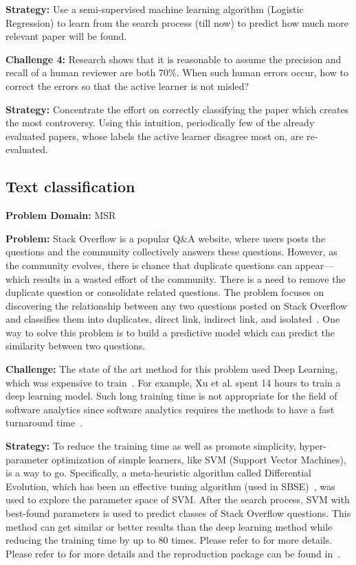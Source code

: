 \documentclass[sigconf,anonymous,review]{acmart}
\begin{document}
\noindent\textbf{Strategy: }
Use a semi-supervised machine learning algorithm (Logistic Regression) to learn from the search process (till now) to predict how much more relevant paper will be found. 

\vspace{1.0ex}
\noindent\textbf{Challenge 4: }
Research shows that it is reasonable to assume the precision and recall of a human reviewer are both 70\%. When such human errors occur, how to correct the errors so that the active learner is not misled?

\noindent\textbf{Strategy: }
Concentrate the effort on correctly classifying the paper which creates the most controversy. Using this intuition, periodically few of the already evaluated papers, whose labels the active learner disagree most on, are re-evaluated.

    \subsection{Text classification}
\noindent\textbf{Problem Domain: } MSR

\noindent\textbf{Problem: } Stack Overflow is a popular Q\&A website, where users posts the questions and the community collectively answers these questions. However, as the community evolves, there is chance that duplicate questions can appear---which results in a wasted effort of the community. There is a need to remove the duplicate question or consolidate related questions. The problem focuses on discovering the relationship between any two questions posted on Stack Overflow and classifies them into duplicates, direct link, indirect link, and isolated~\cite{fu2017easy, xu2016predicting}. One way to solve this problem is to build a predictive model which can predict the similarity between two questions. 

\noindent\textbf{Challenge: } The state of the art method for this problem used Deep Learning, which was expensive to train~\cite{xu2016predicting}. For example, Xu et al. spent 14 hours to train a deep learning model. Such long training time is not appropriate for the field of software analytics since software analytics requires the methods to have a fast turnaround time~\cite{zhang2013software}.

\noindent\textbf{Strategy: }To reduce the training time as well as promote simplicity, hyper-parameter optimization of simple learners, like SVM (Support Vector Machines), is a way to go. Specifically, a {meta-heuristic algorithm called} Differential Evolution, which has been an effective tuning algorithm (used in SBSE)~\cite{fu2016tuning},
was used to explore the parameter space of SVM. After the search process,
 SVM with best-found parameters is used to predict classes of Stack Overflow questions. This method can get similar or better results
than the deep learning method while reducing the training time by up to 80 times. Please refer to \cite{fu2017easy} for more details. Please refer to \cite{fu2017easy} for more details and the reproduction package can be found in~.
\end{document}
